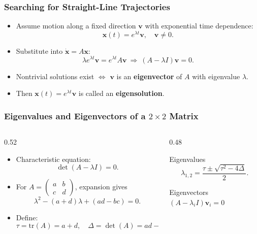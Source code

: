 \documentclass{beamer}
\begin{document}
\begin{frame}
  \frametitle{Searching for Straight-Line Trajectories}
  \begin{itemize}
    \item Assume motion along a fixed direction $\mathbf{v}$ with exponential time dependence:
      \[
        \mathbf{x}(t) = e^{\lambda t}\mathbf{v}, \quad \mathbf{v}\neq 0.
      \]
    \item Substitute into $\dot{\mathbf{x}}=A\mathbf{x}$:
      \[
        \lambda e^{\lambda t}\mathbf{v} = e^{\lambda t}A\mathbf{v}
        \ \Rightarrow\ (A-\lambda I)\mathbf{v}=0.
      \]
    \item Nontrivial solutions exist $\iff$ $\mathbf{v}$ is an \textbf{eigenvector} of $A$
      with eigenvalue $\lambda$.
    \item Then $\mathbf{x}(t)=e^{\lambda t}\mathbf{v}$ is called an \textbf{eigensolution}.
  \end{itemize}
\end{frame}

\begin{frame}
  \frametitle{Eigenvalues and Eigenvectors of a $2\times2$ Matrix}
  \begin{columns}[T]
    \begin{column}{0.52\textwidth}
      \begin{itemize}
        \item Characteristic equation:
          \[
            \det(A-\lambda I)=0.
          \]
        \item For
          \(
            A=\begin{pmatrix} a & b \\ c & d \end{pmatrix}
          \),
          expansion gives
          \[
            \lambda^2 - (a+d)\lambda + (ad-bc)=0.
          \]
        \item Define:
          \[
            \tau=\mathrm{tr}(A)=a+d,\quad
            \Delta=\det(A)=ad-bc.
          \]
      \end{itemize}
    \end{column}
    \begin{column}{0.48\textwidth}
      \begin{block}{Eigenvalues}
        \[
        \lambda_{1,2} = \frac{\tau \pm \sqrt{\tau^2-4\Delta}}{2}.
        \]
      \end{block}
      \vspace{0.3em}
      \begin{block}{Eigenvectors}
        $(A-\lambda_i I)\mathbf{v}_i=0$
      \end{block}
    \end{column}
  \end{columns}
\end{frame}
\end{document}

